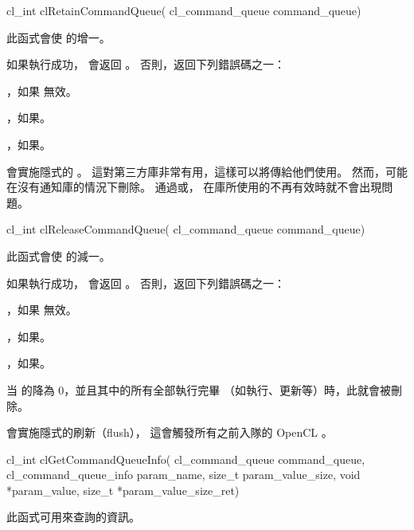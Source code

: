 
\startCLFUNC
cl_int clRetainCommandQueue(
		cl_command_queue command_queue)
\stopCLFUNC

此函式會使  的增一。

如果執行成功， 會返回 。
否則，返回下列錯誤碼之一：
\startigBase
\item {}，如果  無效。
\item {}，如果\scdevfailres。
\item {}，如果\schostfailres。
\stopigBase

 會實施隱式的 。
這對第三方庫非常有用，這樣可以將傳給他們使用。
然而，可能在沒有通知庫的情況下刪除。
通過或，
在庫所使用的不再有效時就不會出現問題。


\startCLFUNC
cl_int clReleaseCommandQueue(
		cl_command_queue command_queue)
\stopCLFUNC

此函式會使  的減一。

如果執行成功， 會返回 。
否則，返回下列錯誤碼之一：
\startigBase
\item {}，如果  無效。
\item {}，如果\scdevfailres。
\item {}，如果\schostfailres。
\stopigBase

当  的降為 0，並且其中的所有全部執行完畢
（如執行、更新等）時，此就會被刪除。

會實施隱式的刷新（flush），
這會觸發所有之前入隊的 OpenCL 。


\startCLFUNC
cl_int clGetCommandQueueInfo(
		cl_command_queue command_queue,
		cl_command_queue_info param_name,
		size_t param_value_size,
		void *param_value,
		size_t *param_value_size_ret)
\stopCLFUNC

此函式可用來查詢的資訊。

